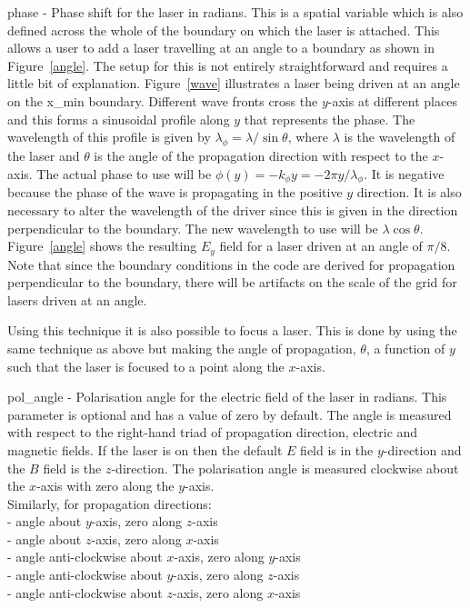 {\emphtext phase} - Phase shift for the laser in radians. This is a spatial
variable which is also defined across the whole of the boundary on which the
laser is attached. This allows a user to add a laser travelling at an angle
to a boundary as shown in Figure~\ref{angle}.
The setup for this is not entirely straightforward and requires a little
bit of explanation. Figure~\ref{wave} illustrates a laser being driven at
an angle on the x\_min boundary. Different wave fronts cross the $y$-axis
at different places and this forms a sinusoidal profile along $y$ that
represents the phase. The wavelength of this profile is
given by $\lambda_\phi = \lambda / \sin\theta$, where $\lambda$ is the
wavelength of the laser and $\theta$ is the angle of the propagation
direction with respect to the $x$-axis. The actual phase to use will
be $\phi(y) = -k_\phi y = -2\pi y / \lambda_\phi$. It is negative because
the phase of the wave is propagating in the positive $y$ direction.
It is also necessary to alter the wavelength of the driver since this
is given in the direction perpendicular to the boundary. The new
wavelength to use will be $\lambda\cos\theta$. Figure~\ref{angle} shows
the resulting $E_y$ field for a laser driven at an angle of $\pi / 8$. Note
that since the boundary conditions in the code are derived for propagation
perpendicular to the boundary, there will be artifacts on the scale of the
grid for lasers driven at an angle.

Using this technique it is also possible to focus a laser. This is done by
using the same technique as above but making the angle of propagation,
$\theta$, a function of $y$ such that the laser is focused to a point along
the $x$-axis.\\



{\emphtext pol\_angle} - Polarisation angle for the electric field of the
laser in radians. This parameter is optional and has a value of zero by default.
The angle is measured with respect to the right-hand triad of propagation
direction, electric and magnetic fields. If the laser is on
 then the default $E$ field is in the $y$-direction and
the $B$ field is the $z$-direction. The polarisation angle is measured
clockwise about the $x$-axis with zero along the $y$-axis.\\
Similarly, for propagation directions:\\
 - angle about $y$-axis, zero along $z$-axis\\
 - angle about $z$-axis, zero along $x$-axis\\
 - angle anti-clockwise about $x$-axis, zero along $y$-axis\\
 - angle anti-clockwise about $y$-axis, zero along $z$-axis\\
 - angle anti-clockwise about $z$-axis, zero along $x$-axis\\


